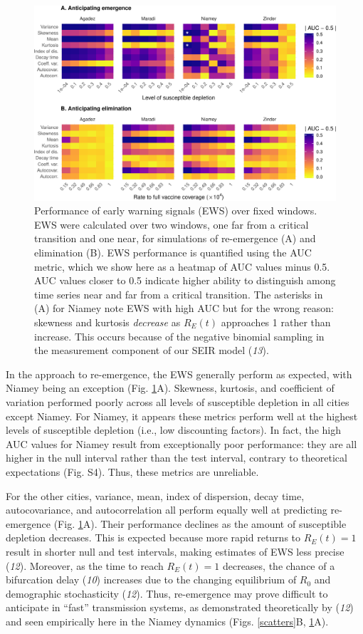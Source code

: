 \documentclass[3p]{elsarticle} %
\makeatletter
\def\maxwidth{\ifdim\Gin@nat@width>\linewidth\linewidth
\else\Gin@nat@width\fi}
\let\Oldincludegraphics\includegraphics
\renewcommand{\includegraphics}[1]{\Oldincludegraphics[width=\maxwidth]{#1}}
\makeatother
\begin{document}
\begin{figure}
\centering
\includegraphics{measles-ews-manuscript_files/figure-latex/aucs-1.pdf}
\caption{Performance of early warning signals (EWS) over fixed windows.
EWS were calculated over two windows, one far from a critical transition
and one near, for simulations of re-emergence (A) and elimination (B).
EWS performance is quantified using the AUC metric, which we show here
as a heatmap of AUC values minus 0.5. AUC values closer to 0.5 indicate
higher ability to distinguish among time series near and far from a
critical transition. The asterisks in (A) for Niamey note EWS with high
AUC but for the wrong reason: skewness and kurtosis \emph{decrease} as
\(R_E(t)\) approaches 1 rather than increase. This occurs because of the
negative binomial sampling in the measurement component of our SEIR
model (\emph{13}). \label{aucs}}
\end{figure}

In the approach to re-emergence, the EWS generally perform as expected,
with Niamey being an exception (Fig. \ref{aucs}A). Skewness, kurtosis,
and coefficient of variation performed poorly across all levels of
susceptible depletion in all cities except Niamey. For Niamey, it
appears these metrics perform well at the highest levels of susceptible
depletion (i.e., low discounting factors). In fact, the high AUC values
for Niamey result from exceptionally poor performance: they are all
higher in the null interval rather than the test interval, contrary to
theoretical expectations (Fig. S4). Thus, these metrics are unreliable.

For the other cities, variance, mean, index of dispersion, decay time,
autocovariance, and autocorrelation all perform equally well at
predicting re-emergence (Fig. \ref{aucs}A). Their performance declines
as the amount of susceptible depletion decreases. This is expected
because more rapid returns to \(R_E(t)=1\) result in shorter null and
test intervals, making estimates of EWS less precise (\emph{12}).
Moreover, as the time to reach \(R_E(t)=1\) decreases, the chance of a
bifurcation delay (\emph{10}) increases due to the changing equilibrium
of \(R_0\) and demographic stochasticity (\emph{12}). Thus, re-emergence
may prove difficult to anticipate in ``fast'' transmission systems, as
demonstrated theoretically by (\emph{12}) and seen empirically here in
the Niamey dynamics (Figs. \ref{scatters}B, \ref{aucs}A).
\end{document}
